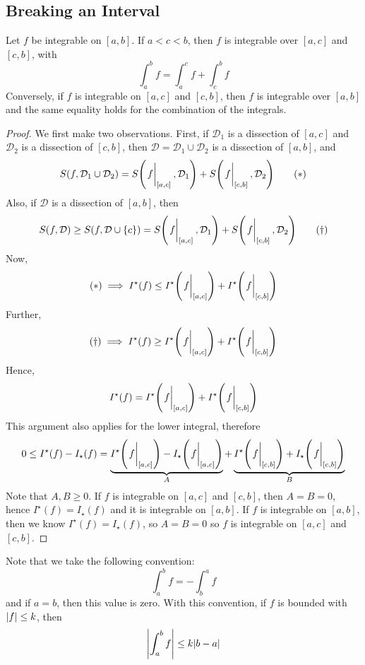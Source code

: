 \subsection{Breaking an Interval}
Let \(f\) be integrable on \([a, b]\).
If \(a < c < b\), then \(f\) is integrable over \([a, c]\) and \([c, b]\), with
\[
	\int_a^b f = \int_a^c f + \int_c^b f
\]
Conversely, if \(f\) is integrable on \([a, c]\) and \([c, b]\), then \(f\) is integrable over \([a, b]\) and the same equality holds for the combination of the integrals.
\begin{proof}
	We first make two observations.
	First, if \(\mathcal D_1\) is a dissection of \([a, c]\) and \(\mathcal D_2\) is a dissection of \([c, b]\), then \(\mathcal D = \mathcal D_1 \cup \mathcal D_2\) is a dissection of \([a, b]\), and
	\begin{equation}
		S(f, \mathcal D_1 \cup \mathcal D_2) = S\qty(\eval{f}_{[a, c]}, \mathcal D_1) + S\qty(\eval{f}_{[c, b]}, \mathcal D_2)
		\tag{\(\ast\)}
	\end{equation}
	Also, if \(\mathcal D\) is a dissection of \([a, b]\), then
	\begin{equation}
		S(f, \mathcal D) \geq S(f, \mathcal D \cup \{ c \}) = S\qty(\eval{f}_{[a, c]}, \mathcal D_1) + S\qty(\eval{f}_{[c, b]}, \mathcal D_2)
		\tag{\(\dagger\)}
	\end{equation}
	Now,
	\[
		(\ast) \implies I^\star(f) \leq I^\star\qty(\eval{f}_{[a, c]}) + I^\star\qty(\eval{f}_{[c, b]})
	\]
	Further,
	\[
		(\dagger) \implies I^\star(f) \geq I^\star\qty(\eval{f}_{[a, c]}) + I^\star\qty(\eval{f}_{[c, b]})
	\]
	Hence,
	\[
		I^\star(f) = I^\star\qty(\eval{f}_{[a, c]}) + I^\star\qty(\eval{f}_{[c, b]})
	\]
	This argument also applies for the lower integral, therefore
	\[
		0 \leq I^\star(f) - I_\star(f) = \underbrace{I^\star\qty(\eval{f}_{[a, c]}) - I_\star\qty(\eval{f}_{[a, c]})}_{A} + \underbrace{I^\star\qty(\eval{f}_{[c, b]}) + I_\star\qty(\eval{f}_{[c, b]})}_{B}
	\]
	Note that \(A, B \geq 0\).
	If \(f\) is integrable on \([a, c]\) and \([c, b]\), then \(A = B = 0\), hence \(I^\star(f) = I_\star(f)\) and it is integrable on \([a, b]\).
	If \(f\) is integrable on \([a, b]\), then we know \(I^\star(f) = I_\star(f)\), so \(A = B = 0\) so \(f\) is integrable on \([a, c]\) and \([c, b]\).
\end{proof}
\noindent Note that we take the following convention:
\[
	\int_a^b f = -\int_b^a f
\]
and if \(a=b\), then this value is zero.
With this convention, if \(f\) is bounded with \(\abs{f} \leq k\), then
\[
	\abs{\int_a^b f} \leq k\abs{b - a}
\]

